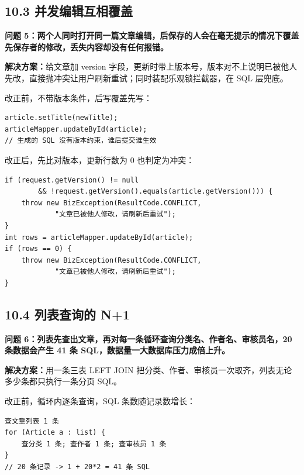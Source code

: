 \documentclass[zihao=-4,UTF8,openany]{ctexart}
\renewcommand{\_}{\textunderscore\allowbreak}
\begin{document}
\subsection*{\texorpdfstring{\textbf{10.3 并发编辑互相覆盖}}{10.3 并发编辑互相覆盖}}\label{ux5e76ux53d1ux63a7ux5236}

\noindent\textbf{问题 5：两个人同时打开同一篇文章编辑，后保存的人会在毫无提示的情况下覆盖先保存者的修改，丢失内容却没有任何报错。}

\textbf{解决方案：}给文章加 version 字段，更新时带上版本号，版本对不上说明已被他人先改，直接抛冲突让用户刷新重试；同时装配乐观锁拦截器，在 SQL 层兜底。

改正前，不带版本条件，后写覆盖先写：

\begin{lstlisting}
article.setTitle(newTitle);
articleMapper.updateById(article);
// 生成的 SQL 没有版本约束，谁后提交谁生效
\end{lstlisting}

改正后，先比对版本，更新行数为 0 也判定为冲突：

\begin{lstlisting}
if (request.getVersion() != null
        && !request.getVersion().equals(article.getVersion())) {
    throw new BizException(ResultCode.CONFLICT,
            "文章已被他人修改，请刷新后重试");
}
int rows = articleMapper.updateById(article);
if (rows == 0) {
    throw new BizException(ResultCode.CONFLICT,
            "文章已被他人修改，请刷新后重试");
}
\end{lstlisting}

\subsection*{\texorpdfstring{\textbf{10.4 列表查询的 N+1}}{10.4 列表查询的 N+1}}\label{n1}

\noindent\textbf{问题 6：列表先查出文章，再对每一条循环查询分类名、作者名、审核员名，20 条数据会产生 41 条 SQL，数据量一大数据库压力成倍上升。}

\textbf{解决方案：}用一条三表 LEFT JOIN 把分类、作者、审核员一次取齐，列表无论多少条都只执行一条分页 SQL。

改正前，循环内逐条查询，SQL 条数随记录数增长：

\begin{lstlisting}[language={},numbers=none]
查文章列表 1 条
for (Article a : list) {
    查分类 1 条; 查作者 1 条; 查审核员 1 条
}
// 20 条记录 -> 1 + 20*2 = 41 条 SQL
\end{lstlisting}
\end{document}
